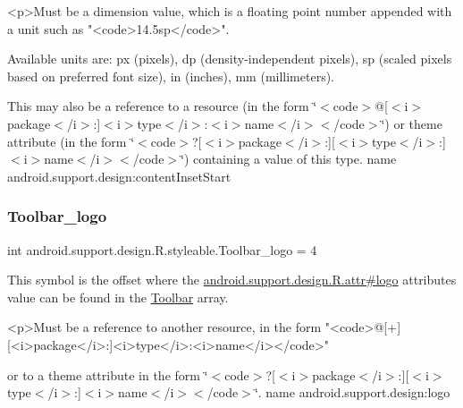 \begin{DoxyVerb}      <p>Must be a dimension value, which is a floating point number appended with a unit such as "<code>14.5sp</code>".
\end{DoxyVerb}
 Available units are\+: px (pixels), dp (density-\/independent pixels), sp (scaled pixels based on preferred font size), in (inches), mm (millimeters). 

This may also be a reference to a resource (in the form \char`\"{}$<$code$>$@\mbox{[}$<$i$>$package$<$/i$>$\+:\mbox{]}$<$i$>$type$<$/i$>$\+:$<$i$>$name$<$/i$>$$<$/code$>$\char`\"{}) or theme attribute (in the form \char`\"{}$<$code$>$?\mbox{[}$<$i$>$package$<$/i$>$\+:\mbox{]}\mbox{[}$<$i$>$type$<$/i$>$\+:\mbox{]}$<$i$>$name$<$/i$>$$<$/code$>$\char`\"{}) containing a value of this type.  name android.\+support.\+design\+:content\+Inset\+Start \mbox{\label{classandroid_1_1support_1_1design_1_1R_1_1styleable_ad96363fdb81c5fc57ecb7ca211213675}} 
\subsubsection{\texorpdfstring{Toolbar\+\_\+logo}{Toolbar\_logo}}
{\footnotesize\ttfamily int android.\+support.\+design.\+R.\+styleable.\+Toolbar\+\_\+logo = 4\hspace{0.3cm}{\ttfamily [static]}}

This symbol is the offset where the \hyperlink{classandroid_1_1support_1_1design_1_1R_1_1attr_a71cd4cca1c1a2d4a719434831f5e0c6d}{android.\+support.\+design.\+R.\+attr\#logo} attribute\textquotesingle{}s value can be found in the \hyperlink{classandroid_1_1support_1_1design_1_1R_1_1styleable_a7783ebe780dbe2a845802a40519a46e9}{Toolbar} array.

\begin{DoxyVerb}      <p>Must be a reference to another resource, in the form "<code>@[+][<i>package</i>:]<i>type</i>:<i>name</i></code>"
\end{DoxyVerb}
 or to a theme attribute in the form \char`\"{}$<$code$>$?\mbox{[}$<$i$>$package$<$/i$>$\+:\mbox{]}\mbox{[}$<$i$>$type$<$/i$>$\+:\mbox{]}$<$i$>$name$<$/i$>$$<$/code$>$\char`\"{}.  name android.\+support.\+design\+:logo \mbox{\label{classandroid_1_1support_1_1design_1_1R_1_1styleable_adad105d3b3d5e31681bf954d0a474308}} 
